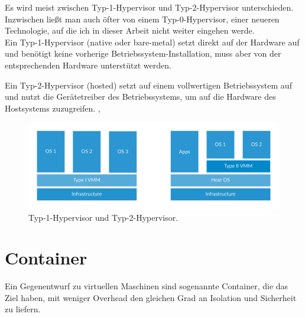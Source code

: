 \noindent Es wird meist zwischen Typ-1-Hypervisor und Typ-2-Hypervisor unterschieden. Inzwischen ließt man auch öfter von einem Typ-0-Hypervisor, einer neueren Technologie, auf die ich in dieser Arbeit nicht weiter eingehen werde.\\

\noindent Ein Typ-1-Hypervisor (native oder bare-metal) setzt direkt auf der Hardware auf und benötigt keine vorherige Betriebssystem-Installation, muss aber von der entsprechenden Hardware unterstützt werden.

\vspace{\baselineskip}

\noindent Ein Typ-2-Hypervisor (hosted) setzt auf einem vollwertigen Betriebssystem auf und nutzt die Gerätetreiber des Betriebssystems, um auf die Hardware des Hostsystems zuzugreifen. \cite{wiki:hyper}, \cite{6903537}\\

\begin{figure}[!ht] %
  \centering
  \includegraphics[width=1\textwidth]{images/2-hypervisors.png}
  \caption{Typ-1-Hypervisor und Typ-2-Hypervisor. \cite{wiki:hyper}}
\end{figure}


\section{Container}
Ein Gegenentwurf zu virtuellen Maschinen sind sogenannte Container, die das Ziel haben, mit weniger Overhead den gleichen Grad an Isolation und Sicherheit zu liefern.

